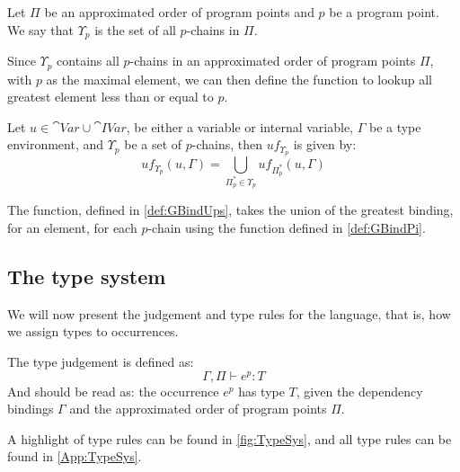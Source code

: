 \documentclass[../../master.tex]{subfiles}
\begin{document}
\begin{definition}[]
	Let $\Pi$ be an approximated order of program points and $p$ be a program point.
	We say that $\Upsilon_p$ is the set of all $p$-chains in $\Pi$.
\end{definition}

Since $\Upsilon_p$ contains all $p$-chains in an approximated order of program points $\Pi$, with $p$ as the maximal element, we can then define the function to lookup all greatest element less than or equal to $p$.

\begin{definition}[]\label{def:GBindUps}
	Let $u\in \cat{Var}\cup\cat{IVar}$, be either a variable or internal variable, $\Gamma$ be a type environment, and $\Upsilon_p$ be a set of $p$-chains, then $uf_{\Upsilon_p}$ is given by:
	$$uf_{\Upsilon_p}(u,\Gamma)=\bigcup_{\Pi_p^{*}\in\Upsilon_p}uf_{\Pi_p^{*}}(u,\Gamma)$$
\end{definition}

The function, defined in \cref{def:GBindUps}, takes the union of the greatest binding, for an element, for each $p$-chain using the function defined in \cref{def:GBindPi}.

\subsection{The type system}\label{sec:Judge}
We will now present the judgement and type rules for the language, that is, how we assign types to occurrences.

The type judgement is defined as:
$$\Gamma,\Pi\vdash e^p: T$$
And should be read as: the occurrence $e^p$ has type $T$, given the dependency bindings $\Gamma$ and the approximated order of program points $\Pi$.

A highlight of type rules can be found in \cref{fig:TypeSys}, and all type rules can be found in \cref{App:TypeSys}.
\end{document}
